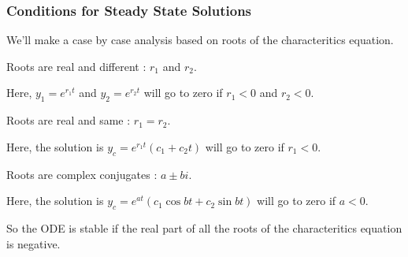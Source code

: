 \subsubsection{Conditions for Steady State Solutions}

We'll make a case by case analysis based on roots of the characteritics equation.

\begin{case}
Roots are real and different : $r_1$ and $r_2$.

Here, $y_1 = e^{r_1 t}$ and $y_2 = e^{r_2 t}$ will go to zero if $r_1 < 0$ and $r_2 < 0$.
\end{case}

\begin{case}
Roots are real and same : $r_1 = r_2$.

Here, the solution is $y_c = e^{r_1 t}(c_1 + c_2 t)$ will go to zero if $r_1 < 0$.
\end{case}

\begin{case}
Roots are complex conjugates : $a \pm bi$.

Here, the solution is $y_c = e^{at}(c_1 \cos bt + c_2 \sin bt)$ will go to zero if $a < 0$. 
\end{case}

So the ODE is stable if the real part of all the roots of the characteritics equation is negative.